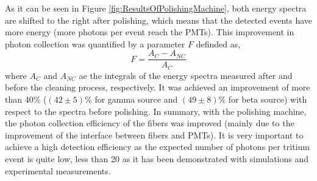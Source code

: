 As it can be seen in Figure \ref{fig:ResultsOfPolishingMachine}, both energy spectra are shifted to the right after polishing, which means that the detected events have more energy (more photons per event reach the PMTs). This improvement in photon collection was quantified by a parameter $F$ definded as,
\begin{equation}
F=\frac{A_{C}-A_{NC}}{A_{C}}
\label{eq:RelativeImprovement}
\end{equation}
where $A_{C}$ and $A_{NC}$ ae the integrals of the energy spectra measured after and before the cleaning process, respectively. It was achieved an improvement of more than 40\% ($(42 \pm 5)\%$ for gamma source and $(49 \pm 8)\%$ for beta source) with respect to the spectra before polishing. In summary, with the polishing machine, the photon collection efficiency of the fibers was improved  (mainly due to the improvement of the interface between fibers and PMTs). It is very important to achieve a high detection efficiency as the expected number of photons per tritium event is quite low, less than 20 as it has been demonstrated with simulations and experimental measurements.